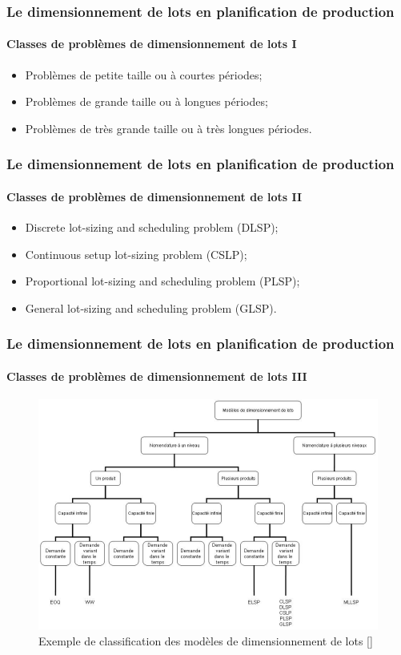 \documentclass[11pt]{beamer}
\begin{document}
 \begin{frame}
 \frametitle{Le dimensionnement de lots en planification de production}
 \framesubtitle{Classes de problèmes de dimensionnement de lots I}
	\begin{itemize}
		\item Problèmes de petite taille ou à courtes périodes;
		\item Problèmes de grande taille ou à longues périodes;
		\item Problèmes de très grande taille ou à très longues périodes.
	\end{itemize}
 \end{frame}
 
 \begin{frame}
 \frametitle{Le dimensionnement de lots en planification de production}
 \framesubtitle{Classes de problèmes de dimensionnement de lots II}
	\begin{itemize}
		\item Discrete lot-sizing and scheduling problem (DLSP);
		\item Continuous setup lot-sizing problem (CSLP);
		\item Proportional lot-sizing and scheduling problem (PLSP);
		\item General lot-sizing and scheduling problem (GLSP).
	\end{itemize}
 \end{frame}
 
 \begin{frame}
 \frametitle{Le dimensionnement de lots en planification de production}
 \framesubtitle{Classes de problèmes de dimensionnement de lots III}
 \begin{center}
		\begin{figure}[!h]
			\includegraphics[scale=.3]{img/classification_dimensionnement.png}
			\caption{Exemple de classification des modèles de dimensionnement de lots []}
			\label{fig:classification_dimensionnement_lots}
		\end{figure}
	\end{center}
 \end{frame}
 
\end{document}

